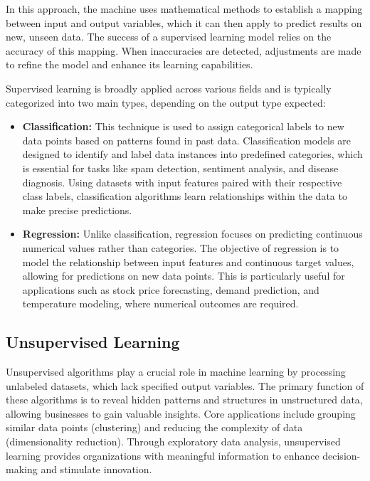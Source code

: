 \documentclass[12pt]{report}
\begin{document}
    In this approach, the machine uses mathematical methods to establish a mapping between input and output variables, which it can then apply to predict results on new, unseen data. The success of a supervised learning model relies on the accuracy of this mapping. When inaccuracies are detected, adjustments are made to refine the model and enhance its learning capabilities.

    Supervised learning is broadly applied across various fields and is typically categorized into two main types, depending on the output type expected:
    
    \begin{itemize}
        \item {\bfseries Classification:} This technique is used to assign categorical labels to new data points based on patterns found in past data. Classification models are designed to identify and label data instances into predefined categories, which is essential for tasks like spam detection, sentiment analysis, and disease diagnosis. Using datasets with input features paired with their respective class labels, classification algorithms learn relationships within the data to make precise predictions.
        \item {\bfseries Regression:} Unlike classification, regression focuses on predicting continuous numerical values rather than categories. The objective of regression is to model the relationship between input features and continuous target values, allowing for predictions on new data points. This is particularly useful for applications such as stock price forecasting, demand prediction, and temperature modeling, where numerical outcomes are required.
    \end{itemize}

    \subsection{Unsupervised Learning}
    Unsupervised algorithms play a crucial role in machine learning by processing unlabeled datasets, which lack specified output variables. The primary function of these algorithms is to reveal hidden patterns and structures in unstructured data, allowing businesses to gain valuable insights. Core applications include grouping similar data points (clustering) and reducing the complexity of data (dimensionality reduction). Through exploratory data analysis, unsupervised learning provides organizations with meaningful information to enhance decision-making and stimulate innovation.
\end{document}
